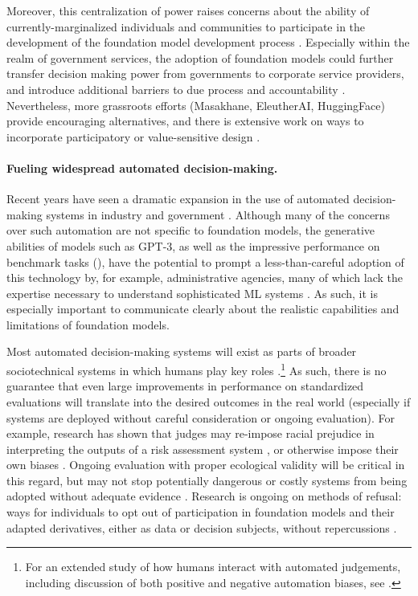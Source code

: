 Moreover, this centralization of power raises concerns about the ability of currently-marginalized individuals and communities to participate in the development of the foundation model development process \citep{kalluri.2020}.  Especially within the realm of government services, the adoption of foundation models could further transfer decision making power from governments to corporate service providers, and introduce additional barriers to due process and accountability \citep{citron.2008}. Nevertheless, more grassroots efforts (\eg Masakhane, EleutherAI, HuggingFace) provide encouraging alternatives, and there is extensive work on ways to incorporate participatory or value-sensitive design  \citep{friedman.2019, prabhakaran.2020}.

\paragraph{Fueling widespread automated decision-making.}

Recent years have seen a dramatic expansion in the use of automated decision-making systems in industry and government \citep{oneil.2016, engstrom2020government}. 
Although many of the concerns over such automation are not specific to foundation models, the generative abilities of models such as GPT-3, as well as the impressive performance on benchmark tasks
(\eg \citet{devlin2019bert}), have the potential to prompt a less-than-careful adoption of this technology by, for example, administrative agencies, many of which lack the expertise necessary to understand sophisticated ML systems \citep{calo.2021}. 
As such, it is especially important to communicate clearly about the realistic capabilities and limitations of foundation models.

Most automated decision-making systems will exist as parts of broader sociotechnical systems in which humans play key roles \citep{selbst.2018}.\footnote{For an extended study of how humans interact with automated judgements, including discussion of both positive and negative automation biases, see \citet{hidalgo2021how}.} 
As such, there is no guarantee that even large improvements in performance on standardized evaluations will translate into the desired outcomes in the real world (especially if systems are deployed without careful consideration or ongoing evaluation).
For example, research has shown that judges may re-impose racial prejudice in interpreting the outputs of a risk assessment system \citep{albright.2019}, or otherwise impose their own biases \citep{stevenson.2021}. 
Ongoing evaluation with proper ecological validity \citep{vries2020ecological} will be critical in this regard, but may not stop potentially dangerous or costly systems from being adopted without adequate evidence \citep{ferguson.2017}. 
Research is ongoing on methods of refusal: ways for individuals to opt out of participation in foundation models and their adapted derivatives, either as data or decision subjects, without repercussions   \citep{benjamin_ruha_bioethics}.

